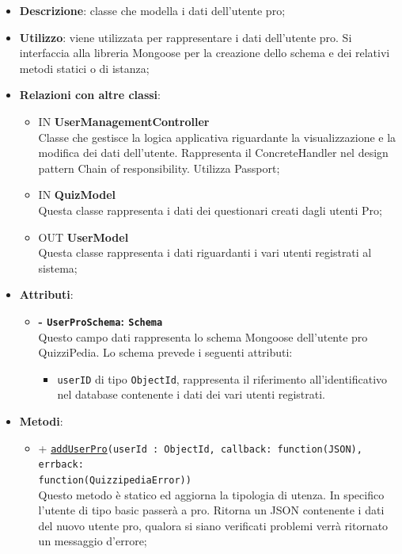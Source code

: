 \begin{itemize}
	\item \textbf{Descrizione}: classe che modella i dati dell'utente pro;
	\item \textbf{Utilizzo}: viene utilizzata per rappresentare i dati dell'utente pro. Si interfaccia alla libreria Mongoose per la creazione dello schema e dei relativi metodi statici o di istanza;
	\item \textbf{Relazioni con altre classi}:
		\begin{itemize}
			\item IN \textbf {UserManagementController} \\
			Classe che gestisce la logica applicativa riguardante la visualizzazione e la modifica dei dati dell'utente.
Rappresenta il ConcreteHandler nel design pattern Chain of responsibility. Utilizza Passport;
			\item IN \textbf{QuizModel} \\
			Questa classe rappresenta i dati dei questionari creati dagli utenti Pro;
			\item OUT \textbf{UserModel} \\
			Questa classe rappresenta i dati riguardanti i vari utenti registrati al sistema;
		\end{itemize}
	\item \textbf{Attributi}:
		\begin{itemize}
			\item \textbf{- \texttt{UserProSchema}: \texttt{Schema}} \\
			Questo campo dati rappresenta lo schema Mongoose dell'utente pro QuizziPedia. Lo schema prevede i seguenti attributi:
			\begin{itemize}
				\item 
					\texttt{userID} di tipo \texttt{ObjectId}, rappresenta il riferimento all'identificativo nel database contenente i dati dei vari utenti registrati.
			\end{itemize}		
		\end{itemize}	
	\item \textbf{Metodi}:
		\begin{itemize}
		\item
		+ \texttt{\underline{addUserPro}(userId : ObjectId, callback: function(JSON), errback: \\function(QuizzipediaError))} \\	
		Questo metodo è statico ed aggiorna la tipologia di utenza. In specifico l'utente di tipo basic passerà a pro. Ritorna un JSON contenente i dati del nuovo utente pro, qualora si siano verificati problemi verrà ritornato un messaggio d'errore;	\\	

\end{itemize}
\end{itemize}
